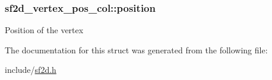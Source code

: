 \subsubsection[{position}]{ sf2d\+\_\+vertex\+\_\+pos\+\_\+col\+::position}\label{structsf2d__vertex__pos__col_a72c48b1c976984ef0512a28e8af7a1e4}
Position of the vertex 

The documentation for this struct was generated from the following file\+:\begin{DoxyCompactItemize}
\item 
include/\hyperlink{sf2d_8h}{sf2d.\+h}\end{DoxyCompactItemize}
